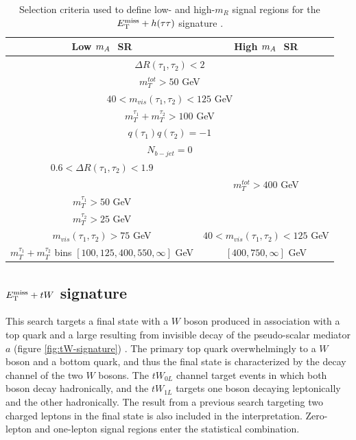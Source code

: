 \begin{table}[h!]
    \centering
    \begin{tabular}{|c|c|}
    \hline
     \textbf{Low $m_A~$ SR}    &  \textbf{High $m_A~$ SR} \\
     \hline
      \multicolumn{2}{|c|}{$\Delta R(\tau_1, \tau_2) < 2$}  \\ \hline
      \multicolumn{2}{|c|}{$m_T^{tot} > 50$ GeV }    \\ \hline
       \multicolumn{2}{|c|}{$40 < m_{vis}(\tau_1, \tau_2) < 125 $  GeV}  \\ \hline
        \multicolumn{2}{|c|}{$m_T^{\tau_1} + m_T^{\tau_2} > 100$ GeV} \\ \hline
        \multicolumn{2}{|c|}{$q(\tau_1)q(\tau_2)=-1$} \\  \hline
        \multicolumn{2}{|c|}{$N_{b-jet} = 0$} \\  \hline
        $0.6<\Delta R(\tau_1,\tau_2) < 1.9$  &   \\ \hline
        & $m_T^{tot}>400$ GeV \\ \hline
        $m_T^{\tau_1}>50$ GeV & \\ \hline
        $m_T^{\tau_2}>25$ GeV & \\ \hline
        $m_{vis}(\tau_1, \tau_2)>75$ GeV & $40<m_{vis}(\tau_1, \tau_2)<125$ GeV \\ 
    \hline
        $m_T^{\tau_1} + m_T^{\tau_2}$ bins $[100,125,400,550,\infty]$ GeV & $[400, 750, \infty]$ GeV \\ \hline
    \hline
    \end{tabular}
    \caption{Selection criteria used to define low- and high-$m_R$ signal regions for the $E_{\mathrm{T}}^{\mathrm{miss}}+h(\tau\tau)$ signature \cite{HDBS-2018-50}.}
    \label{tab:htautau-selection}
\end{table}

\subsection{\texorpdfstring{$E_{\mathrm{T}}^{\mathrm{miss}}+tW$}{TEXT} signature}
\label{subsect:metjw}
This search targets a final state with a $W$ boson produced in association with a top quark and a large \met resulting from invisible decay of the pseudo-scalar mediator $a$ (figure \ref{fig:tW-signature}) \cite{EXOT-2021-01}. The primary top quark overwhelmingly to a $W$ boson and a bottom quark, and thus the final state is characterized by the decay channel of the two $W$ bosons. The $tW_{0L}$ channel target events in which both boson decay hadronically, and the $tW_{1L}$ targets one boson decaying leptonically and the other hadronically. The result from a previous search targeting two charged leptons \cite{EXOT-2018-43} in the final state is also included in the interpretation. Zero-lepton and one-lepton signal regions enter the statistical combination. 

